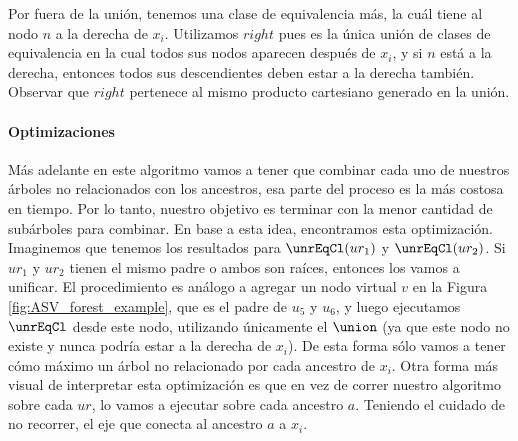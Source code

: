 Por fuera de la unión, tenemos una clase de equivalencia más, la cuál tiene al nodo $n$ a la derecha de $x_i$. Utilizamos $right$ pues es la única unión de clases de equivalencia en la cual todos sus nodos aparecen después de $x_i$, y si $n$ está a la derecha, entonces todos sus descendientes deben estar a la derecha también. Observar que $right$ pertenece al mismo producto cartesiano generado en la unión. %

\paragraph{Optimizaciones}\label{slight_improvement}

Más adelante en este algoritmo vamos a tener que combinar cada uno de nuestros árboles no relacionados con los ancestros, esa parte del proceso es la más costosa en tiempo. Por lo tanto, nuestro objetivo es terminar con la menor cantidad de subárboles para combinar. En base a esta idea, encontramos esta optimización. Imaginemos que tenemos los resultados para $\unrEqCl(ur_1)$ y $\unrEqCl(ur_2)$. Si $ur_1$ y $ur_2$ tienen el mismo padre o ambos son raíces, entonces los vamos a unificar. El procedimiento es análogo a agregar un nodo virtual $v$ en la Figura \ref{fig:ASV_forest_example}, que es el padre de $u_5$ y $u_6$, y luego ejecutamos $\unrEqCl$ desde este nodo, utilizando únicamente el $\union$ (ya que este nodo no existe y nunca podría estar a la derecha de $x_i$). De esta forma sólo vamos a tener cómo máximo un árbol no relacionado por cada ancestro de $x_i$. Otra forma más visual de interpretar esta optimización es que en vez de correr nuestro algoritmo sobre cada $ur$, lo vamos a ejecutar sobre cada ancestro $a$. Teniendo el cuidado de no recorrer, el eje que conecta al ancestro $a$ a $x_i$.

